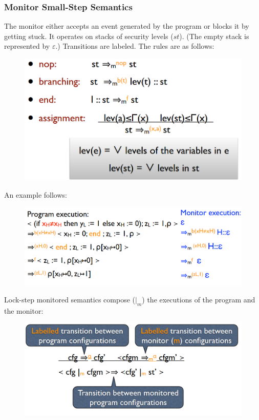 \documentclass[10pt,a4paper]{report}
\begin{document}
\subsubsection{Monitor Small-Step Semantics}
The monitor either accepts an event generated by the program or blocks it by getting stuck. It operates on stacks of security
levels ($st$). (The empty stack is represented by $\varepsilon$.) Transitions are labeled. The rules are as follows:
\begin{figure}[H]
\centering
\includegraphics[scale=0.4]{33.png}
\end{figure}
An example follows:
\begin{figure}[H]
\centering
\includegraphics[scale=0.4]{34.png}
\end{figure}
Lock-step monitored semantics compose ($|_m$) the executions of the program and the monitor:
\begin{figure}[H]
\centering
\includegraphics[scale=0.4]{345.png}
\end{figure}
\end{document}
